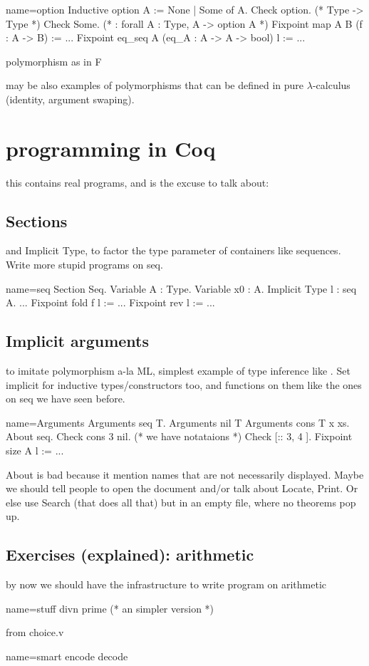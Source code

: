 \begin{coq}{name=option}{}
Inductive option A := None | Some of A.
Check option. (* Type -> Type *)
Check Some. (* : forall A : Type, A -> option A *)
Fixpoint map A B (f : A -> B) := ...
Fixpoint eq_seq A (eq_A : A -> A -> bool) l := ...
\end{coq}

polymorphism as in F

may be also examples of polymorphisms that can be defined in pure
$\lambda$-calculus (identity, argument swaping).

\section{programming in Coq}
this contains real programs, and is the excuse to talk about:

\subsection{Sections}
and Implicit Type, to factor the type parameter of containers like
sequences.  Write more stupid programs on seq.

\begin{coq}{name=seq}{}
Section Seq.
Variable A : Type.
Variable x0 : A.
Implicit Type l : seq A.
...
Fixpoint fold f l := ...
Fixpoint rev l := ...
\end{coq}


\subsection{Implicit arguments}
to imitate polymorphism a-la ML, simplest example of type inference
like .  Set implicit for inductive types/constructors too,
and functions on them like the ones on seq we have seen before.

\begin{coq}{name=Arguments}{}
Arguments seq {T}.
Arguments nil {T}
Arguments cons {T} x xs.
About seq.
Check cons 3 nil.
(* we have notataions *)
Check [:: 3, 4 ].
Fixpoint size A l := ...
\end{coq}

About is bad because it mention names that are not necessarily displayed.
Maybe we should tell people to open the document and/or talk about Locate,
Print.  Or else use Search (that does all that) but in an empty
file, where no theorems pop up.

\subsection{Exercises (explained): arithmetic}
by now we should have the infrastructure to write program on arithmetic

\begin{coq}{name=stuff}{}
divn
prime  (* an simpler version *)
\end{coq}

from choice.v

\begin{coq}{name=smart}{}
encode
decode
\end{coq}
